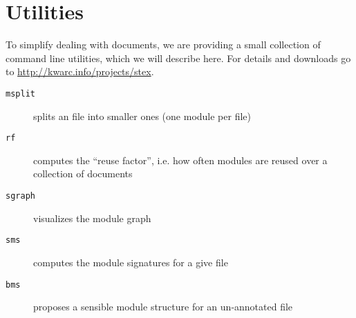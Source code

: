 \documentclass{article}
\begin{document}
\section{Utilities}\label{sec:utilities}

To simplify dealing with {\stex} documents, we are providing a small collection of command
line utilities, which we will describe here. For details and downloads go to
{\url{http://kwarc.info/projects/stex}}.

\begin{description}
\item[{\tt{msplit}}] splits an {\stex} file into smaller ones (one module per file)
\item[{\tt{rf}}] computes the ``reuse factor'', i.e. how often {\stex} modules are reused
  over a collection of documents 
\item[{\tt{sgraph}}] visualizes the module graph
\item[{\tt{sms}}] computes the {\stex} module signatures for a give {\stex} file
\item[{\tt{bms}}] proposes a sensible module structure for an un-annotated {\stex} file
\end{description}
\printbibliography
\end{document}
